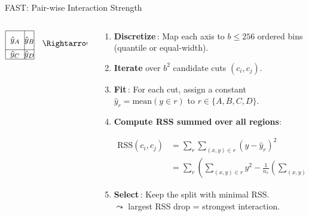 \documentclass[11pt,compress,t,notes=noshow, aspectratio=169, xcolor=table]{beamer}
\begin{document}
\begin{frame}{FAST: Pair-wise Interaction Strength}
\begin{columns}[T,totalwidth=\textwidth]
\begin{column}{0.4\textwidth}
{\[\begin{array}{@{}l@{\hskip 0.6em}l@{\hskip 0.6em}l@{\hskip 0.6em}l@{\hskip 0.6em}l}
\begin{tikzpicture}[baseline=(current bounding box.center)]
        \draw (0,0) rectangle (1.2,1.2);
        \draw (0.8,0) -- (0.8,1.2); 
        \draw (0,0.4) -- (1.2,0.4); 
        \node at (0.4,0.2) {$\hat{y}_C$};
        \node at (1,0.2) {$\hat{y}_D$};
        \node at (0.4,0.8) {$\hat{y}_A$};
        \node at (1,0.8) {$\hat{y}_B$};
    \end{tikzpicture} & \text{$\Rightarrow$} & \text{$RSS_{b^2}$}\\ 
\end{array}
\]
}
\end{column}
\begin{column}{0.6\textwidth}
\small
\begin{enumerate}\itemsep4pt
  \item<1-> {\bf Discretize}\,: Map each axis to \(b\!\le\!256\) ordered
        bins (quantile or equal-width).
  \item<2-> {\bf Iterate} over \(b^{2}\) candidate cuts
        \((c_i,c_j)\). %
  \item<2-> {\bf Fit}\,: For each cut, assign a constant
        \(\hat y_r\!=\!\text{mean}(y\!\in\!r)\) to
        \(r\!\in\!\{A,B,C,D\}\).
  \item<2-> {\bf Compute RSS summed over all regions}:   
  {\footnotesize
  \[
\begin{aligned}
\text{RSS}(c_i, c_j) 
&= \sum_{r} \sum_{(x,y) \in r} (y - \hat{y}_r)^2 \\
&= \sum_{r} \left( \sum_{(x,y) \in r} y^2 - \frac{1}{n_r} \left(\sum_{(x,y) \in r} y \right)^2 \right)
\end{aligned}
\]
         
              
 }
  \item<2-> {\bf Select}\,: Keep the split with minimal RSS.\\
  $\leadsto$ largest RSS drop = strongest interaction. \\%
\end{enumerate}

\end{column}
\end{columns}
\end{frame}
\end{document}
